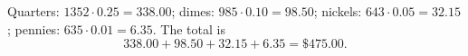Quarters: $1352\cdot0.25=338.00$; dimes: $985\cdot0.10=98.50$; nickels: $643\cdot0.05=32.15$; pennies: $635\cdot0.01=6.35$. The total is
\[338.00+98.50+32.15+6.35=\boxed{\$475.00}.\]
